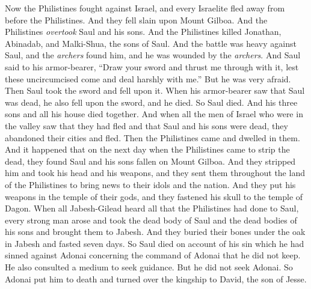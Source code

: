 \begin{biblechapter} %
 Now the Philistines fought against Israel, and every Israelite fled away from before the Philistines. And they fell slain upon Mount Gilboa.
\verse And the Philistines \textit{overtook} Saul and his sons. And the Philistines killed Jonathan, Abinadab, and Malki-Shua, the sons of Saul.
\verse And the battle was heavy against Saul, and the \textit{archers} found him, and he was wounded by the \textit{archers}.
\verse And Saul said to his armor-bearer, “Draw your sword and thrust me through with it, lest these uncircumcised come and deal harshly with me.” But he was very afraid. Then Saul took the sword and fell upon it.
\verse When his armor-bearer saw that Saul was dead, he also fell upon the sword, and he died.
\verse So Saul died. And his three sons and all his house died together.
\verse And when all the men of Israel who were in the valley saw that they had fled and that Saul and his sons were dead, they abandoned their cities and fled. Then the Philistines came and dwelled in them.
\verse And it happened that on the next day when the Philistines came to strip the dead, they found Saul and his sons fallen on Mount Gilboa.
\verse And they stripped him and took his head and his weapons, and they sent them throughout the land of the Philistines to bring news to their idols and the nation.
\verse And they put his weapons in the temple of their gods, and they fastened his skull to the temple of Dagon.
\verse When all Jabesh-Gilead heard all that the Philistines had done to Saul,
\verse every strong man arose and took the dead body of Saul and the dead bodies of his sons and brought them to Jabesh. And they buried their bones under the oak in Jabesh and fasted seven days.
\verse So Saul died on account of his sin which he had sinned against Adonai concerning the command of Adonai that he did not keep. He also consulted a medium to seek guidance.
\verse But he did not seek Adonai. So Adonai put him to death and turned over the kingship to David, the son of Jesse.
\end{biblechapter}

